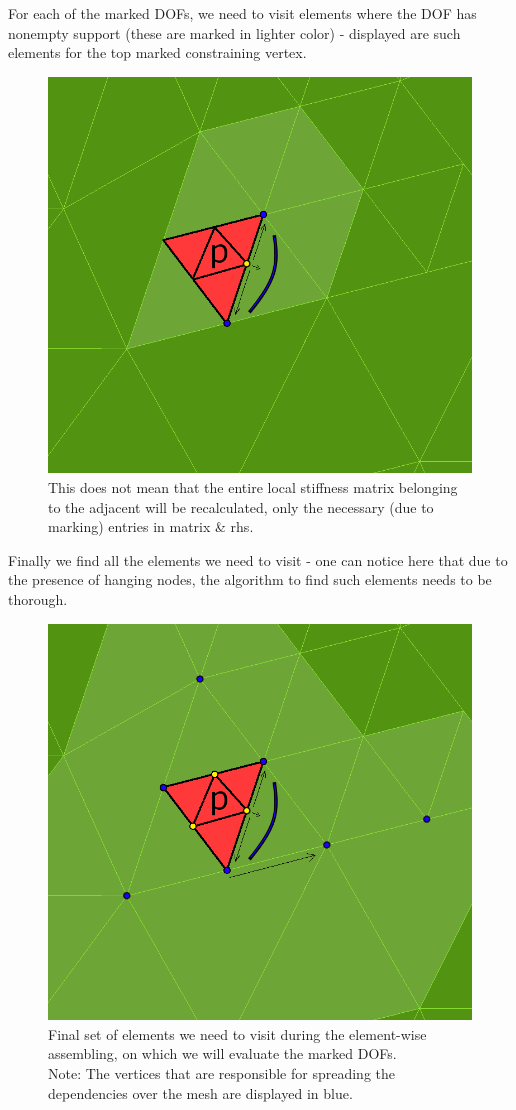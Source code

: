 \documentclass{beamer}
\begin{document}
\begin{frame}
For each of the marked DOFs, we need to visit elements where the DOF has nonempty support (these are marked in lighter color) - displayed are such elements for the top marked constraining vertex.

\begin{center}
	\begin{figure}[h!]
			\centering
			\includegraphics[width=.4\textwidth]{recalculation-4.png}
			\caption{This does not mean that the entire local stiffness matrix belonging to the adjacent will be recalculated, only the necessary (due to marking) entries in matrix \& rhs.}
	\end{figure}
\end{center}
\end{frame}

\begin{frame}
Finally we find all the elements we need to visit - one can notice here that due to the presence of hanging nodes, the algorithm to find such elements needs to be thorough.

\begin{center}
	\begin{figure}[h!]
			\centering
			\includegraphics[width=.4\textwidth]{recalculation-5.png}
			\caption{Final set of elements we need to visit during the element-wise assembling, on which we will evaluate the marked DOFs.\ \\Note: The vertices that are responsible for spreading the dependencies over the mesh are displayed in blue.}
	\end{figure}
\end{center}
\end{frame}
\end{document}
